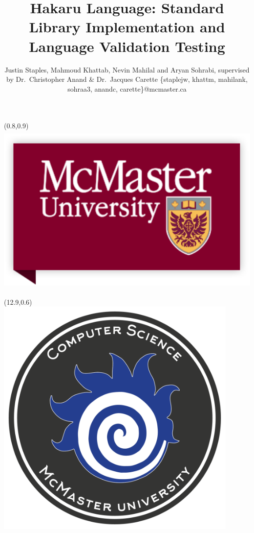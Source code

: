 \documentclass[22pt]{beamer}
\title{Hakaru Language: Standard Library Implementation and Language Validation Testing}
\subtitle{}  %
\author[Justin Staples, Mahmoud Khattab, Nevin Mahilal and Aryan Sohrabi]{Justin Staples, Mahmoud Khattab, Nevin Mahilal and Aryan Sohrabi, supervised by Dr.~Christopher Anand \& Dr.~Jacques Carette \vspace{0.3cm} \newline \small \{staplejw, khattm, mahilank, sohraa3, anandc, carette\}@mcmaster.ca}
\institute[McMaster University]{\small{Department of Computing and Software, McMaster University}}
\date{}
\begin{document}

\begin{frame}[fragile]

\begin{textblock}{2}(0.8,0.9)
\includegraphics[height=8.5cm]{mac.png}
\end{textblock}

\begin{textblock}{2}(12.9,0.6)
\includegraphics[height=12cm]{fireball.png} 
\end{textblock}


\end{frame}
\end{document}
